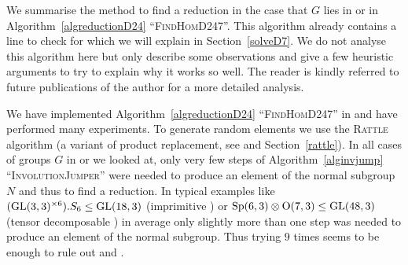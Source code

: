We summarise the method to find a reduction in the case that $G$ lies in
 or  in Algorithm~\ref{algreductionD24} ``\textsc{FindHomD247}''. 
This algorithm
already contains a line to check for  which we will explain in
Section~\ref{solveD7}. We do not analyse this algorithm here but only
describe some observations and give a few heuristic arguments to try to
explain why it works so well. The reader is kindly referred to future
publications of the author for a more detailed analysis.

\begin{Obs}
%
We have implemented Algorithm~\ref{algreductionD24}
``\textsc{FindHomD247}'' in {\GAP} and have
performed many experiments. To generate random elements we use the
\textsc{Rattle} algorithm (a variant of product replacement, see
%
\cite{LGMurray, LGO97} and Section~\ref{rattle}). 
In all cases of groups $G$ in  or  we
looked at, only very few steps of Algorithm~\ref{alginvjump}
``\textsc{InvolutionJumper}'' were needed to produce an element of the
normal subgroup $N$ and thus to find a reduction. In typical examples
like $(\GL(3,3)^{\times 6}).S_6 \le \GL(18,3)$ (imprimitive ) or $\Sp(6,3)
\otimes \mathrm{O}(7,3) \le \GL(48,3)$ (tensor decomposable ) 
in average only slightly more than one
step was needed to produce an element of the normal subgroup. Thus trying
$9$ times seems to be enough to rule out  and .
\end{Obs}


